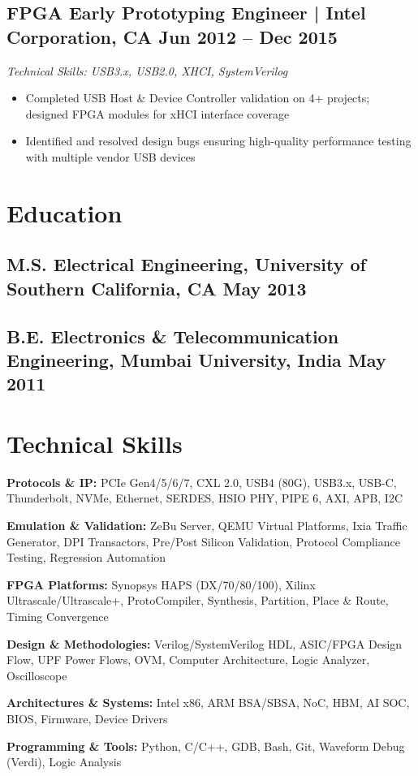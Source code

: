 \documentclass[10pt,letterpaper]{article}
\newcommand{\jobheader}[4]{%
  \subsection*{\textbf{#1} | #2  \hfill #4}
  \vspace{-1pt}
  {\small\textit{Technical Skills: #3}}
  \vspace{0pt}
}
\begin{document}
\jobheader{FPGA Early Prototyping Engineer}{Intel Corporation, CA}{USB3.x, USB2.0, XHCI, SystemVerilog}{Jun 2012 -- Dec 2015}

\begin{itemize}
\item Completed USB Host \& Device Controller validation on 4+ projects; designed FPGA modules for xHCI interface coverage
\item Identified and resolved design bugs ensuring high-quality performance testing with multiple vendor USB devices
\end{itemize}
\vspace{-4pt}

\section{Education}

\subsection*{\textbf{M.S. Electrical Engineering, University of Southern California, CA} \hfill May 2013}
\subsection*{\textbf{B.E. Electronics \& Telecommunication Engineering, Mumbai University, India} \hfill May 2011}
\vspace{4pt}

\section{Technical Skills}

{\small
\textbf{Protocols \& IP:} PCIe Gen4/5/6/7, CXL 2.0, USB4 (80G), USB3.x, USB-C, Thunderbolt, NVMe, Ethernet, SERDES, HSIO PHY, PIPE 6, AXI, APB, I2C

\textbf{Emulation \& Validation:} ZeBu Server, QEMU Virtual Platforms, Ixia Traffic Generator, DPI Transactors, Pre/Post Silicon Validation, Protocol Compliance Testing, Regression Automation

\textbf{FPGA Platforms:} Synopsys HAPS (DX/70/80/100), Xilinx Ultrascale/Ultrascale+, ProtoCompiler, Synthesis, Partition, Place \& Route, Timing Convergence

\textbf{Design \& Methodologies:} Verilog/SystemVerilog HDL, ASIC/FPGA Design Flow, UPF Power Flows, OVM, Computer Architecture, Logic Analyzer, Oscilloscope

\textbf{Architectures \& Systems:} Intel x86, ARM BSA/SBSA, NoC, HBM, AI SOC, BIOS, Firmware, Device Drivers

\textbf{Programming \& Tools:} Python, C/C++, GDB, Bash, Git, Waveform Debug (Verdi), Logic Analysis
}
\end{document}

